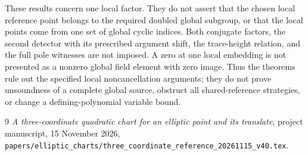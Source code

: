 \documentclass[11pt,a4paper]{article}
\theoremstyle{remark}\newtheorem{remark}[theorem]{Remark}
\begin{document}
These results concern one local factor. They do not assert that the
chosen local reference point belongs to the required doubled global
subgroup, or that the local points come from one set of global cyclic
indices. Both conjugate factors, the second detector with its prescribed
argument shift, the trace-height relation, and the full pole witnesses
are not imposed. A zero at one local embedding is not presented as a
nonzero global field element with zero image. Thus the theorems rule
out the specified local noncancellation arguments; they do not prove
unsoundness of a complete global source, obstruct all shared-reference
strategies, or change a defining-polynomial variable bound.

\begin{thebibliography}{9}
\emph{A three-coordinate quadratic chart for an elliptic
point and its translate}, project manuscript, 15 November 2026,
\nolinkurl{papers/elliptic_charts/three_coordinate_reference_20261115_v40.tex}.
\end{thebibliography}
\end{document}
